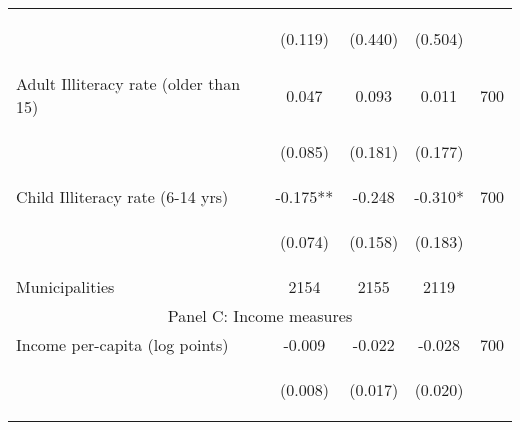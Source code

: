 \begin{tabular}{lcccc}
\vspace{4pt} &  \begin{footnotesize}(0.119)\end{footnotesize}   &
			    \begin{footnotesize}(0.440)\end{footnotesize}   &
			    \begin{footnotesize}(0.504)\end{footnotesize}   &
			     \\          

Adult Illiteracy rate (older than 15)  &  0.047    &    0.093   &     0.011  &  700  \\

\vspace{4pt} &  \begin{footnotesize}(0.085)\end{footnotesize}   &
			    \begin{footnotesize}(0.181)\end{footnotesize}   &
			    \begin{footnotesize}(0.177)\end{footnotesize}   &
			     \\          

Child Illiteracy rate (6-14 yrs)  &  -0.175**    &    -0.248   &     -0.310*  &  700  \\

\vspace{4pt} &  \begin{footnotesize}(0.074)\end{footnotesize}   &
			    \begin{footnotesize}(0.158)\end{footnotesize}   &
			    \begin{footnotesize}(0.183)\end{footnotesize}   &
			     \\          


Municipalities  &   2154   &    2155     &  2119      	\\

\hline		

\multicolumn{5}{c}{Panel C: Income measures} \\

Income per-capita (log points)     &  -0.009    &    -0.022   &     -0.028  &  700   \\

\vspace{4pt} &  \begin{footnotesize}(0.008)\end{footnotesize}   &
			    \begin{footnotesize}(0.017)\end{footnotesize}   &
			    \begin{footnotesize}(0.020)\end{footnotesize}   &
			     \\          



\end{tabular}

